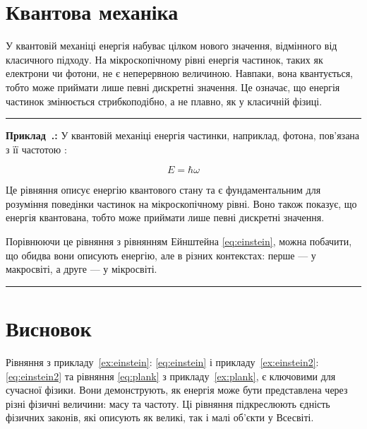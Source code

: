 \documentclass[14pt]{extarticle}
\newcounter{ex}[section]
\newenvironment{Example}[1][]{\refstepcounter{ex}\par\vspace{14pt}\hrule\vspace{6pt}
   \textbf{Приклад~\thesection.\theex: #1} \color{red}\rmfamily
   \setcounter{equation}{0}\renewcommand{\theequation}{\thesection.\theex-\arabic{equation}}}{\color{black}\hrule\rmfamily\vspace{6pt}}
\begin{document}
\section{Квантова механіка}


У квантовій механіці енергія набуває цілком нового значення, відмінного від класичного підходу. На
мікроскопічному рівні енергія частинок, таких як електрони чи фотони, не є неперервною величиною.
Навпаки, вона квантується, тобто може приймати лише певні дискретні значення. Це означає, що енергія
частинок змінюється стрибкоподібно, а не плавно, як у класичній фізиці.

\begin{Example}\label{ex:plank}
	У квантовій механіці енергія частинки, наприклад, фотона, пов'язана з її частотою :

	\begin{equation}\label{eq:plank}
		E = \hbar\omega
	\end{equation}

	Це рівняння описує енергію квантового стану та є фундаментальним для розуміння поведінки
	частинок на мікроскопічному рівні. Воно також показує, що енергія квантована, тобто може
	приймати лише певні дискретні значення.

	Порівнюючи це рівняння з рівнянням Ейнштейна \eqref{eq:einstein}, можна побачити, що обидва
	вони описують енергію, але в різних контекстах: перше — у макросвіті, а друге — у мікросвіті.
\end{Example}

\section{Висновок}

Рівняння з прикладу~\ref{ex:einstein}: \eqref{eq:einstein} і прикладу~\ref{ex:einstein2}:
\eqref{eq:einstein2} та рівняння \ref{eq:plank} з
прикладу~\ref{ex:plank}, є ключовими для сучасної фізики. Вони
демонструють, як енергія може бути представлена через різні фізичні величини: масу та частоту.
Ці рівняння підкреслюють єдність фізичних законів, які описують як великі, так і малі об'єкти у
Всесвіті.
\end{document}
